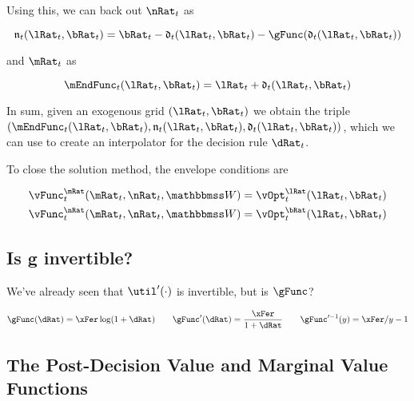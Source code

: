 \documentclass[\econtexRoot/HAFiscal]{subfiles}
\begin{document}
Using this, we can back out $\nRat_{t}$ as

\providecommand{\nEndFunc}{\ensuremath{\mathfrak{n}}}

\begin{equation}
    \nEndFunc_{t}(\lRat_{t}, \bRat_{t}) = \bRat_{t} -
    \dEndFunc_{t}(\lRat_{t}, \bRat_{t}) - \gFunc(\dEndFunc_{t}(\lRat_{t},
        \bRat_{t}))
\end{equation}

and $\mRat_{t}$ as

\begin{equation}
    \mEndFunc_{t}(\lRat_{t}, \bRat_{t}) = \lRat_{t} +
    \dEndFunc_{t}(\lRat_{t}, \bRat_{t})
\end{equation}

In sum, given an exogenous grid $(\lRat_{t}, \bRat_{t})$ we obtain the triple
$\left(\mEndFunc_{t}(\lRat_{t}, \bRat_{t}), \nEndFunc_{t}(\lRat_{t},
        \bRat_{t}), \dEndFunc_{t}(\lRat_{t}, \bRat_{t})\right)$, which
we can use to
create an interpolator for the decision rule $\dRat_{t}$.

To close the solution method, the envelope conditions are

\begin{equation}
    \begin{split}
        \vFunc_{t}^{\mRat}(\mRat_{t}, \nRat_{t}, \Work) & =
        \vOpt_{t}^{\lRat}(\lRat_{t}, \bRat_{t}) \\
        \vFunc_{t}^{\nRat}(\mRat_{t}, \nRat_{t}, \Work) & =
        \vOpt_{t}^{\bRat}(\lRat_{t}, \bRat_{t})
    \end{split}
\end{equation}

\subsection{Is g invertible?}

We've already seen that $\util'(\cdot)$ is invertible, but is $\gFunc$?

\begin{equation}
    \gFunc(\dRat) = \xFer \log(1+\dRat) \qquad \gFunc'(\dRat) =
    \frac{\xFer}{1+\dRat} \qquad \gFunc'^{-1}(y) = \xFer/y - 1
\end{equation}

\subsection{The Post-Decision Value and Marginal Value Functions}
\end{document}
